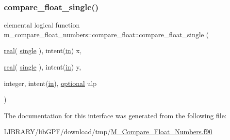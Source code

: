 \subsubsection{\texorpdfstring{compare\+\_\+float\+\_\+single()}{compare\_float\_single()}}
{\footnotesize\ttfamily elemental logical function m\+\_\+compare\+\_\+float\+\_\+numbers\+::compare\+\_\+float\+::compare\+\_\+float\+\_\+single (\begin{DoxyParamCaption}\item[{\hyperlink{read__watch_83_8txt_abdb62bde002f38ef75f810d3a905a823}{real}( \hyperlink{namespacem__compare__float__numbers_a5f122d46d6ad7d1cf0b899d9c855c498}{single} ), intent(\hyperlink{M__journal_83_8txt_afce72651d1eed785a2132bee863b2f38}{in})}]{x,  }\item[{\hyperlink{read__watch_83_8txt_abdb62bde002f38ef75f810d3a905a823}{real}( \hyperlink{namespacem__compare__float__numbers_a5f122d46d6ad7d1cf0b899d9c855c498}{single} ), intent(\hyperlink{M__journal_83_8txt_afce72651d1eed785a2132bee863b2f38}{in})}]{y,  }\item[{integer, intent(\hyperlink{M__journal_83_8txt_afce72651d1eed785a2132bee863b2f38}{in}), \hyperlink{option__stopwatch_83_8txt_aa4ece75e7acf58a4843f70fe18c3ade5}{optional}}]{ulp }\end{DoxyParamCaption})\hspace{0.3cm}{\ttfamily [private]}}



The documentation for this interface was generated from the following file\+:\begin{DoxyCompactItemize}
\item 
L\+I\+B\+R\+A\+R\+Y/lib\+G\+P\+F/download/tmp/\hyperlink{M__Compare__Float__Numbers_8f90}{M\+\_\+\+Compare\+\_\+\+Float\+\_\+\+Numbers.\+f90}\end{DoxyCompactItemize}
